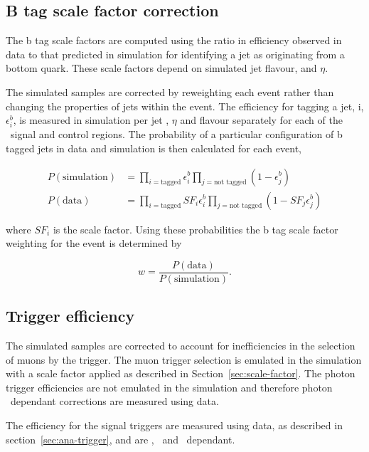 \subsection{B tag scale factor correction}

The b tag scale factors are computed using the ratio in efficiency observed in data
to that predicted in simulation for identifying a jet as originating from a bottom
quark. These scale factors depend on simulated jet flavour, \pt and $\eta$. 

The simulated samples are corrected by reweighting
each event rather than changing the properties of jets within the event. 
The efficiency for tagging a jet, i, $\epsilon_{i}^{b}$, is measured in simulation per 
jet \pt, $\eta$ and flavour separately for each of the 
\alphat~signal and control regions. The probability of a particular configuration 
of b tagged jets in data and simulation is then calculated for each event,

\begin{align}
P(\text{simulation}) &= \prod_{i=\text{tagged}} \epsilon^{b}_{i} \prod_{j=\text{not tagged}} (1-\epsilon^{b}_{j})\\
P(\text{data}) &= \prod_{i=\text{tagged}} SF_{i}\epsilon^{b}_{i} \prod_{j=\text{not tagged}} (1-SF_{j}\epsilon^{b}_{j})
\end{align}

where $SF_{i}$ is the scale factor. Using these probabilities the b tag scale factor 
weighting for the event is determined by

\begin{equation}
w = \frac{P(\text{data})}{P(\text{simulation})}.
\end{equation}

\subsection{Trigger efficiency}

The simulated samples are corrected to account for inefficiencies in the selection of muons
by the trigger. The muon trigger selection is emulated in the simulation with a scale factor
applied as described in Section~\ref{sec:scale-factor}. The photon trigger efficiencies
are not emulated in the simulation and therefore photon \pt~dependant corrections are measured 
using data. 

The efficiency for the signal triggers are measured using data, as described 
in section~\ref{sec:ana-trigger}, and are \scalht, \njet~and \mht~dependant.


